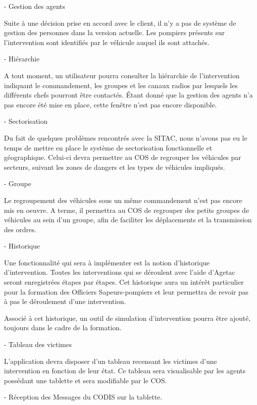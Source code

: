 \documentclass{article}
\begin{document}
\vspace{13pt}
{\large {\color{color01} - Gestion des agents}}

{\color{color01} Suite à une décision prise en accord avec le client, il n'y 
a pas de système de gestion des personnes dans la version actuelle. Les pompiers 
présents sur l'intervention sont identifiés par le véhicule auquel ils sont 
attachés.}

\vspace{13pt}
\parindent=3pt
{\large {\color{color01} - Hiérarchie}}

\parindent=0pt
{\color{color01} A tout moment, un utilisateur pourra consulter la hiérarchie 
de l'intervention indiquant le commandement, les groupes et les canaux radios par 
lesquels les différents chefs pourront être contactés. Étant donné que la 
gestion des agents n'a pas encore été mise en place, cette fenêtre n'est pas 
encore disponible.}

\vspace{13pt}
{\large {\color{color01} - Sectorisation}}

{\color{color01} Du fait de quelques problèmes rencontrés avec la SITAC, nous 
n'avons pas eu le temps de mettre en place le système de sectorisation fonctionnelle 
et géographique. Celui-ci devra permettre au COS de regrouper les véhicules par 
secteurs, suivant les zones de dangers et les types de véhicules impliqués.}

\vspace{13pt}
\parindent=3pt
{\large {\color{color01} - Groupe }}

\parindent=0pt
{\color{color01} Le regroupement des véhicules sous un même commandement n'est 
pas encore mis en oeuvre. A terme, il permettra au COS de regrouper des petits 
groupes de véhicules au sein d'un groupe, afin de faciliter les déplacements 
et la transmission des ordres.}

\vspace{13pt}
{\large {\color{color01} - Historique}}

\parindent=36pt
{\color{color01} Une fonctionnalité qui sera à implémenter est la notion d'historique 
d'intervention. Toutes les interventions qui se déroulent avec l'aide d'Agetac 
seront enregistrées étapes par étapes. Cet historique aura un intérêt particulier 
pour la formation des Officiers Sapeurs-pompiers et leur permettra de revoir pas 
à pas le déroulement d'une intervention.}

\parindent=0pt
{\color{color01} Associé à cet historique, un outil de simulation d'intervention 
pourra être ajouté, toujours dans le cadre de la formation.}

\vspace{13pt}
{\large {\color{color01} - Tableau des victimes}}

{\color{color01} L'application devra disposer d'un tableau recensant les victimes 
d'une intervention en fonction de leur état. Ce tableau sera visualisable par 
les agents possédant une tablette et sera modifiable par le COS.}

\vspace{13pt}
{\color{color01} - Réception des Messages du CODIS sur la tablette.}
\end{document}
